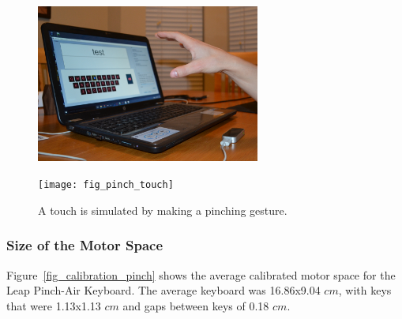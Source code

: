 \begin{figure}[h]
	\centering
	\begin{minipage}[t]{5.8in}
		\begin{minipage}[t]{2.85in}
			\includegraphics[width=2.9in]{fig_pinch_hover}
		\end{minipage}
		\begin{minipage}[t]{2.9in}
			\texttt{[image: fig\_pinch\_touch]}
		\end{minipage}
	\end{minipage}
	\caption[Leap Pinch-Air Word Separation]{A touch is simulated by making a pinching gesture.}
	\label{pinch_press_comparison}
\end{figure}

\subsubsection{Size of the Motor Space}
Figure~\ref{fig_calibration_pinch} shows the average calibrated motor space for the Leap Pinch-Air Keyboard. The average keyboard was 16.86x9.04 $cm$, with keys that were 1.13x1.13 $cm$ and gaps between keys of 0.18 $cm$.